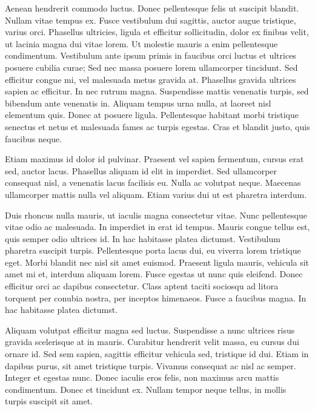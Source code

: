 \documentclass{report}
\begin{document}
	\begin{flushleft}
		Aenean hendrerit commodo luctus. Donec pellentesque felis ut suscipit blandit. Nullam vitae tempus ex. Fusce vestibulum dui sagittis, auctor augue tristique, varius orci. Phasellus ultricies, ligula et efficitur sollicitudin, dolor ex finibus velit, ut lacinia magna dui vitae lorem. Ut molestie mauris a enim pellentesque condimentum. Vestibulum ante ipsum primis in faucibus orci luctus et ultrices posuere cubilia curae; Sed nec massa posuere lorem ullamcorper tincidunt. Sed efficitur congue mi, vel malesuada metus gravida at. Phasellus gravida ultrices sapien ac efficitur. In nec rutrum magna. Suspendisse mattis venenatis turpis, sed bibendum ante venenatis in. Aliquam tempus urna nulla, at laoreet nisl elementum quis. Donec at posuere ligula. Pellentesque habitant morbi tristique senectus et netus et malesuada fames ac turpis egestas. Cras et blandit justo, quis faucibus neque.
	\end{flushleft}
	
	\begin{center}
		Etiam maximus id dolor id pulvinar. Praesent vel sapien fermentum, cursus erat sed, auctor lacus. Phasellus aliquam id elit in imperdiet. Sed ullamcorper consequat nisl, a venenatis lacus facilisis eu. Nulla ac volutpat neque. Maecenas ullamcorper mattis nulla vel aliquam. Etiam varius dui ut est pharetra interdum.
	\end{center}
	
	\begin{flushright}
		Duis rhoncus nulla mauris, ut iaculis magna consectetur vitae. Nunc pellentesque vitae odio ac malesuada. In imperdiet in erat id tempus. Mauris congue tellus est, quis semper odio ultrices id. In hac habitasse platea dictumst. Vestibulum pharetra suscipit turpis. Pellentesque porta lacus dui, eu viverra lorem tristique eget. Morbi blandit nec nisl sit amet euismod. Praesent ligula mauris, vehicula sit amet mi et, interdum aliquam lorem. Fusce egestas ut nunc quis eleifend. Donec efficitur orci ac dapibus consectetur. Class aptent taciti sociosqu ad litora torquent per conubia nostra, per inceptos himenaeos. Fusce a faucibus magna. In hac habitasse platea dictumst.
	\end{flushright}

	{\tiny Aliquam volutpat efficitur magna sed luctus. Suspendisse a nunc ultrices risus gravida scelerisque at in mauris. Curabitur hendrerit velit massa, eu cursus dui ornare id. Sed sem sapien, sagittis efficitur vehicula sed, tristique id dui. Etiam in dapibus purus, sit amet tristique turpis. Vivamus consequat ac nisl ac semper. Integer et egestas nunc. Donec iaculis eros felis, non maximus arcu mattis condimentum. Donec et tincidunt ex. Nullam tempor neque tellus, in mollis turpis suscipit sit amet.}
	
\end{document}
